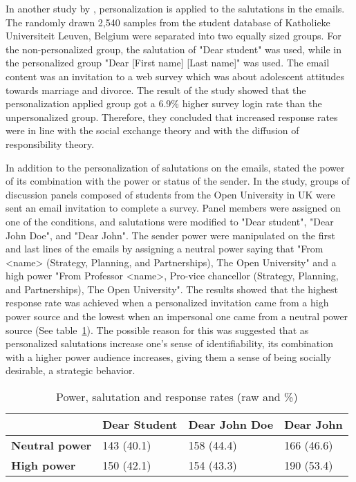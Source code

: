 In another study by \cite{Heerwegh2005}, personalization is applied to the salutations in the emails. The randomly drawn 2,540 samples from the student database of Katholieke Universiteit Leuven, Belgium were separated into two equally sized groups. For the non-personalized group, the salutation of "Dear student" was used, while in the personalized group "Dear [First name] [Last name]" was used. The email content was an invitation to a web survey which was about adolescent attitudes towards marriage and divorce. The result of the study showed that the personalization applied group got a 6.9\% higher survey login rate than the unpersonalized group. Therefore, they concluded that increased response rates were in line with the social exchange theory and with the diffusion of responsibility theory.
\vspace{1cm}

In addition to the personalization of salutations on the emails, \cite{Joinson2007} stated the power of its combination with the power or status of the sender. In the study, groups of discussion panels composed of students from the Open University in UK were sent an email invitation to complete a survey. Panel members were assigned on one of the conditions, and salutations were modified to "Dear student", "Dear John Doe", and "Dear John". The sender power were manipulated on the first and last lines of the emails by assigning a neutral power saying that "From <name> (Strategy, Planning, and Partnerships), The Open University" and a high power "From Professor <name>, Pro-vice chancellor (Strategy, Planning, and Partnerships), The Open University". The results showed that the highest response rate was achieved when a personalized invitation came from a high power source and the lowest when an impersonal one came from a neutral power source (See table~\ref{tab:pow_sal_res}). The possible reason for this was suggested that as personalized salutations increase one's sense of identifiability, its combination with a higher power audience increases, giving them a sense of being socially desirable, a strategic behavior.

\begin{table}[!ht]
\begin{center}
	\caption[Power, salutation and response rates (raw and \%)]{Power, salutation and response rates (raw and \%) \citep{Joinson2007}} \label{tab:pow_sal_res}
    \begin{tabular}{ p{3cm} p{3cm}  p{3cm}  p{3cm} }
	\hline
	& \textbf{Dear Student} & \textbf{Dear John Doe} & \textbf{Dear John} \\ \hline
	\textbf{Neutral power} & 143 (40.1) & 158 (44.4) & 166 (46.6) \\
	\textbf{High power} & 150 (42.1) & 154 (43.3) & 190 (53.4) \\ \hline
    \end{tabular}
\end{center}
\end{table}

